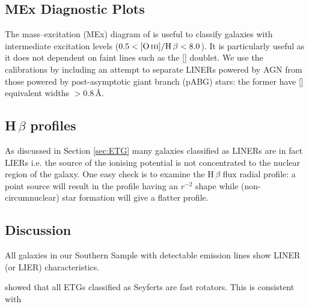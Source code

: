 	\subsection{MEx Diagnostic Plots}
		\label{subsec:MEx}
		The mass--excitation (MEx) diagram of \citet{Juneau2011} is useful to classify galaxies with intermediate excitation levels ($0.5 < \mathrm{[\ion{O}{iii}]/H\,\beta} < 8.0$). It is particularly useful as it does not dependent on faint lines such as the [] doublet. We use the calibrations by \citet{Nyland2016} including an attempt to separate LINERs powered by AGN from those powered by post-asymptotic giant branch (pABG) stars: the former have [] equivalent widths $>0.8$\,\AA. 


	\subsection{H\,$\beta$ profiles}
		\label{subsec:Hb}
		As discussed in Section \ref{sec:ETG} many galaxies classified as LINERs are in fact LIERs \citep[e.g.][]{Sarzi2005, Sarzi2010, Singh2013, Belfiore2016} i.e. the source of the ionising potential is not concentrated to the nuclear region of the galaxy. One easy check is to examine the H\,$\beta$ flux radial profile: a point source will result in the profile having an $r^{-2}$ shape while (non-circumnuclear) star formation will give a flatter profile.





	\subsection{Discussion}
		\label{subsec:discuss}

		All galaxies in our Southern Sample with detectable emission lines show LINER (or LIER) characteristics. 

		\citet{Nyland2016} showed that all ETGs classified as Seyferts are fast rotators. This is consistent with 



